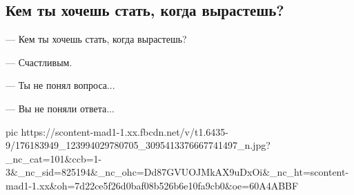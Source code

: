  
 
 
 
 

\subsection{Кем ты хочешь стать, когда вырастешь?}
\label{sec:20_04_2021.fb.respublikalnr.1.schastje_rebenok_vopros}

— Кем ты хочешь стать, когда вырастешь?

— Счастливым.

— Ты не понял вопроса...

— Вы не поняли ответа...


\ifcmt
  pic https://scontent-mad1-1.xx.fbcdn.net/v/t1.6435-9/176183949_123994029780705_3095413376667741497_n.jpg?_nc_cat=101&ccb=1-3&_nc_sid=825194&_nc_ohc=Dd87GVUOJMkAX9uDxOi&_nc_ht=scontent-mad1-1.xx&oh=7d22ce5f26d0baf08b526b6e10fa9cb0&oe=60A4ABBF
\fi

